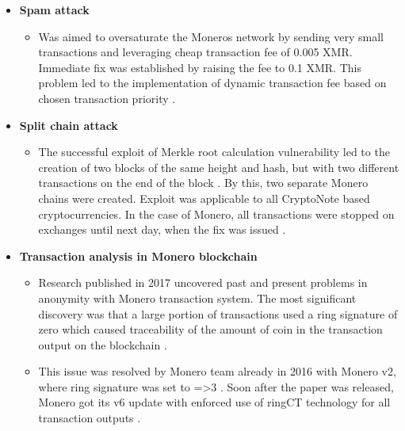 \documentclass[
  printed, %
  table,   %
  nolof,     %
  nolot,     %
           oneside, color
]{fithesis3}
\begin{document}
\begin{itemize}
\item \textbf{Spam attack}
\begin{itemize}
\item Was aimed to oversaturate the Moneros network by sending very small transactions and leveraging cheap transaction fee of 0.005 XMR. Immediate fix was established by raising the fee to 0.1 XMR. This problem led to the implementation of dynamic transaction fee based on chosen transaction priority \cite{monerospamattack}.
\end{itemize}
\item \textbf{Split chain attack}
\begin{itemize}
\item The successful exploit of Merkle root calculation vulnerability led to the creation of two blocks of the same height and hash, but with two different transactions on the end of the block \cite{macheta2014counterfeiting}. By this, two separate Monero chains were created. Exploit was applicable to all CryptoNote based cryptocurrencies. In the case of Monero, all transactions were stopped on exchanges until next day, when the fix was issued \cite{cryptonotemerkletree}.
\end{itemize}
\item \textbf{Transaction analysis in Monero blockchain}
\begin{itemize}
\item Research published in 2017 uncovered past and present problems in anonymity with Monero transaction system. The most significant discovery was that a large portion of transactions used a ring signature of zero which caused traceability of the amount of coin in the transaction output on the blockchain \cite{moser2018empirical}.
\item This issue was resolved by Monero team already in 2016 with Monero v2, where ring signature was set to =>3 \cite{monerov2release}. Soon after the paper was released, Monero got its v6 update with enforced use of ringCT technology for all transaction outputs \cite{monerov6release}.
\end{itemize}
\end{itemize}
\newpage
\end{document}
